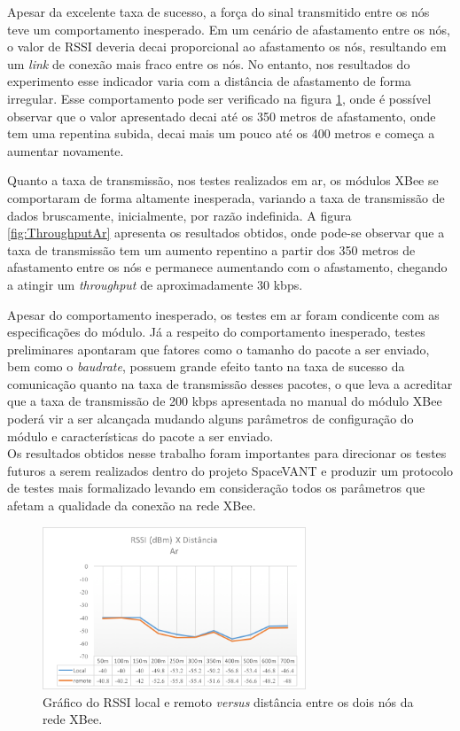 Apesar da excelente taxa de sucesso, a força do sinal transmitido entre os nós teve um comportamento inesperado. Em um cenário de afastamento entre os nós, o valor de RSSI deveria decai proporcional ao afastamento os nós, resultando em um \emph{link} de conexão mais fraco entre os nós. No entanto, nos resultados do experimento esse indicador varia com a distância de afastamento de forma irregular. Esse comportamento pode ser verificado na figura \ref{fig:RangeChao}, onde é possível observar que o valor apresentado decai até os 350 metros de afastamento, onde tem uma repentina subida, decai mais um pouco até os 400 metros e começa a aumentar novamente. 

Quanto a taxa de transmissão, nos testes realizados em ar, os módulos XBee se comportaram de forma altamente inesperada, variando a taxa de transmissão de dados bruscamente, inicialmente, por razão indefinida. A figura \ref{fig:ThroughputAr} apresenta os resultados obtidos, onde pode-se observar que a taxa de transmissão tem um aumento repentino a partir dos 350 metros de afastamento entre os nós e permanece aumentando com o afastamento, chegando a atingir um \emph{throughput} de aproximadamente 30 kbps.

Apesar do comportamento inesperado, os testes em ar foram condicente com as especificações do módulo. Já a respeito do comportamento inesperado, testes preliminares apontaram que fatores como o tamanho do pacote a ser enviado, bem como o \emph{baudrate}, possuem grande efeito tanto na taxa de sucesso da comunicação quanto na taxa de transmissão desses pacotes, o que leva a acreditar que a taxa de transmissão de 200 kbps apresentada no manual do módulo XBee poderá vir a ser alcançada mudando alguns parâmetros de configuração do módulo e características do pacote a ser enviado.\\

Os resultados obtidos nesse trabalho foram importantes para direcionar os testes futuros a serem realizados dentro do projeto SpaceVANT e produzir um protocolo de testes mais formalizado levando em consideração todos os parâmetros que afetam a qualidade da conexão na rede XBee.   

\begin{figure} 
\center
\includegraphics[width=0.7\textwidth]{rangeResultAr.png}
\caption{Gráfico do RSSI local e remoto \emph{versus} distância entre os dois nós da rede XBee.} 
\label{fig:RangeChao}
\end{figure}


